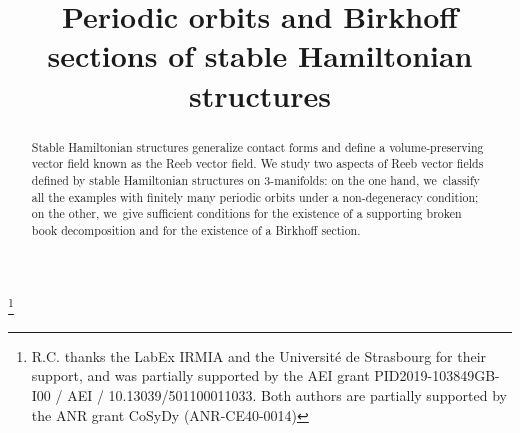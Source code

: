 \documentclass[JEP,XML,SOM,Unicode,NoEqCountersInSection,NoFloatCountersInSection,published]{cedram}
\theoremstyle{definition}
\begin{document}
\frontmatter
\title[Periodic orbits and Birkhoff sections of SHS]{Periodic orbits and Birkhoff sections of stable Hamiltonian structures}

\author[\initial{R.} \lastname{Cardona}]{ }
\address{Departament de Matemàtiques i Informàtica, Universitat de Barcelona,\\
Gran Via de Les Corts Catalanes 585, 08007 Barcelona, Spain\\
\& Centre de Recerca Matemàtica,\\
Campus de Bellaterra, Edifici C, 08193, Barcelona, Spain}

\author[\initial{A.} \lastname{Rechtman}]{ }
\address{Institut Fourier, Université Grenoble Alpes,\\
100 rue des mathématiques, 38610 Gières, France\\
\& Institut Universitaire de France (IUF)}

\thanks{R.C. thanks the LabEx IRMIA and the Université de Strasbourg for their support, and was partially supported by the AEI grant PID2019-103849GB-I00 / AEI / 10.13039/501100011033. Both authors are partially supported by the ANR grant CoSyDy (ANR-CE40-0014)}

\begin{abstract}
Stable Hamiltonian structures generalize contact forms and define a volume-preserving vector field known as the Reeb vector field. We study two aspects of Reeb vector fields defined by stable Hamiltonian structures on $3$-manifolds: on the one hand, we~classify all the examples with finitely many periodic orbits under a non-degeneracy condition; on the other, we~give sufficient conditions for the existence of a supporting broken book decomposition and for the existence of a Birkhoff section.
\end{abstract}




\end{document}
